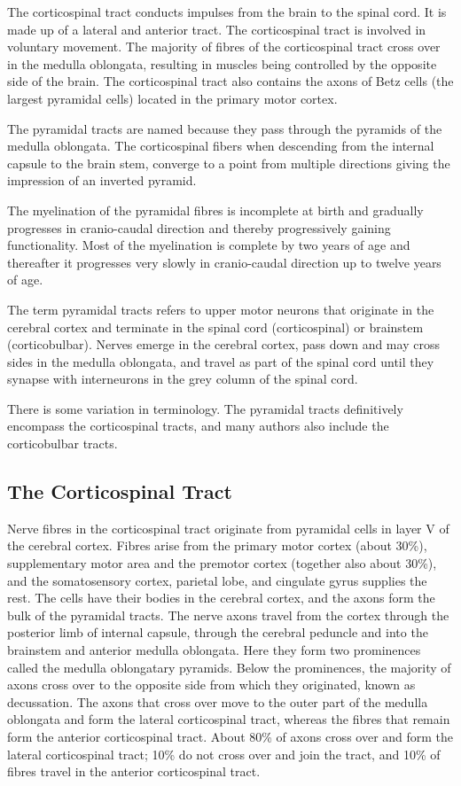 The corticospinal tract conducts impulses from the brain to the spinal cord. It is made up of a lateral and anterior tract. The corticospinal tract is involved in voluntary movement. The majority of fibres of the corticospinal tract cross over in the medulla oblongata, resulting in muscles being controlled by the opposite side of the brain. The corticospinal tract also contains the axons of Betz cells (the largest pyramidal cells) located in the primary motor cortex.

The pyramidal tracts are named because they pass through the pyramids of the medulla oblongata. The corticospinal fibers when descending from the internal capsule to the brain stem, converge to a point from multiple directions giving the impression of an inverted pyramid.

The myelination of the pyramidal fibres is incomplete at birth and gradually progresses in cranio-caudal direction and thereby progressively gaining functionality. Most of the myelination is complete by two years of age and thereafter it progresses very slowly in cranio-caudal direction up to twelve years of age.

The term pyramidal tracts refers to upper motor neurons that originate in the cerebral cortex and terminate in the spinal cord (corticospinal) or brainstem (corticobulbar). Nerves emerge in the cerebral cortex, pass down and may cross sides in the medulla oblongata, and travel as part of the spinal cord until they synapse with interneurons in the grey column of the spinal cord.

There is some variation in terminology. The pyramidal tracts definitively encompass the corticospinal tracts, and many authors also include the corticobulbar tracts.

\hypertarget{the-corticospinal-tract-1}{%
\subsection{The Corticospinal Tract}\label{the-corticospinal-tract-1}}

Nerve fibres in the corticospinal tract originate from pyramidal cells in layer V of the cerebral cortex. Fibres arise from the primary motor cortex (about 30\%), supplementary motor area and the premotor cortex (together also about 30\%), and the somatosensory cortex, parietal lobe, and cingulate gyrus supplies the rest. The cells have their bodies in the cerebral cortex, and the axons form the bulk of the pyramidal tracts. The nerve axons travel from the cortex through the posterior limb of internal capsule, through the cerebral peduncle and into the brainstem and anterior medulla oblongata. Here they form two prominences called the medulla oblongatary pyramids. Below the prominences, the majority of axons cross over to the opposite side from which they originated, known as decussation. The axons that cross over move to the outer part of the medulla oblongata and form the lateral corticospinal tract, whereas the fibres that remain form the anterior corticospinal tract. About 80\% of axons cross over and form the lateral corticospinal tract; 10\% do not cross over and join the tract, and 10\% of fibres travel in the anterior corticospinal tract.

